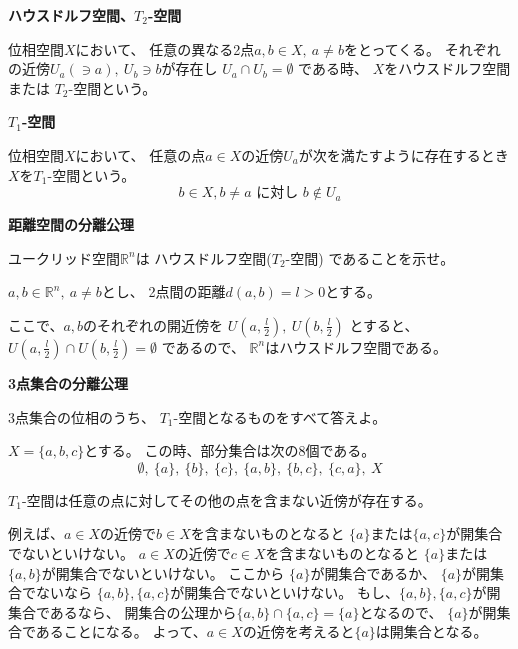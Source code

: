 \documentclass[12pt,b5paper]{ltjsarticle}
\begin{document}
\hrulefill

\textbf{ハウスドルフ空間、$T_{2}$-空間}

位相空間$X$において、
任意の異なる2点$a,b\in X ,\ a\ne b$をとってくる。
それぞれの近傍$U_{a}(\ni a),\ U_{b}\ni b$が存在し
$U_{a}\cap U_{b} =\emptyset$ である時、
$X$をハウスドルフ空間 または $T_2$-空間という。

\textbf{$T_{1}$-空間}

位相空間$X$において、
任意の点$a\in X$の近傍$U_{a}$が次を満たすように存在するとき
$X$を$T_{1}$-空間という。
\begin{equation}
 b\in X, b\ne a \text{ に対し }
  b\not\in U_{a}
\end{equation}



\hrulefill

\textbf{距離空間の分離公理}

ユークリッド空間$\mathbb{R}^{n}$は
ハウスドルフ空間($T_2$-空間)
であることを示せ。

\dotfill

$a,b\in\mathbb{R}^{n},\ a\ne b$とし、
2点間の距離$d(a,b)=l>0$とする。

ここで、$a,b$のそれぞれの開近傍を
$U(a,\frac{l}{2}),\ U(b,\frac{l}{2})$
とすると、
$U(a,\frac{l}{2})\cap U(b,\frac{l}{2}) = \emptyset$
であるので、
$\mathbb{R}^{n}$はハウスドルフ空間である。


\hrulefill

\textbf{3点集合の分離公理}

3点集合の位相のうち、
$T_1$-空間となるものをすべて答えよ。

\dotfill

$X=\{a,b,c\}$とする。
この時、部分集合は次の8個である。
\begin{equation}
  \emptyset,\
  \{a\},\ \{b\},\ \{c\},\
  \{a,b\},\ \{b,c\},\ \{c,a\},\
  X
\end{equation}

$T_{1}$-空間は任意の点に対してその他の点を含まない近傍が存在する。

例えば、$a\in X$の近傍で$b\in X$を含まないものとなると
$\{a\}$または$\{a,c\}$が開集合でないといけない。
$a\in X$の近傍で$c\in X$を含まないものとなると
$\{a\}$または$\{a,b\}$が開集合でないといけない。
ここから
$\{a\}$が開集合であるか、
$\{a\}$が開集合でないなら
$\{a,b\},\{a,c\}$が開集合でないといけない。
もし、$\{a,b\},\{a,c\}$が開集合であるなら、
開集合の公理から$\{a,b\}\cap\{a,c\}=\{a\}$となるので、
$\{a\}$が開集合であることになる。
よって、$a\in X$の近傍を考えると$\{a\}$は開集合となる。
\end{document}

